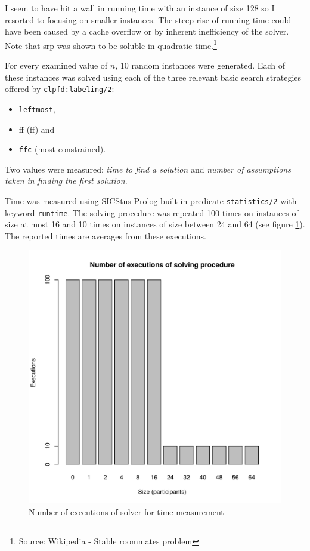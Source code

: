 \documentclass{article}
\newcommand{\code}[1]{\texttt{#1}}
\newcommand{\prolog}{Prolog}
\newcommand{\sicstusprolog}{SICStus \prolog{}}
\newcommand{\srp}{\acrshort{srp}}
\begin{document}
I seem to have hit a wall in running time with an instance of size 128
so I resorted to focusing on smaller instances.
The steep rise of running time could have been caused by a cache overflow
or by inherent inefficiency of the solver.
Note that \srp{} was shown to be soluble
in quadratic time.\footnote{Source: Wikipedia - Stable roommates problem}

For every examined value of $n$, 10 random instances were generated.
Each of these instances was solved using each of the three relevant basic
search strategies offered by \code{clpfd:labeling/2}:

\begin{itemize}
\item \code{leftmost},
\item \acrshort{ff} (\acrlong{ff}) and
\item \code{ffc} (most constrained).
\end{itemize}

Two values were measured: \emph{time to find a solution}
and \emph{number of assumptions taken in finding the first solution}.

Time was measured using \sicstusprolog{} built-in predicate \code{statistics/2}
with keyword \code{runtime}.
The solving procedure was repeated
100 times on instances of size at most 16 and
10 times on instances of size between 24 and 64
(see figure \ref{fig:executions}).
The reported times are averages from these executions.

\begin{figure}
\centering
\includegraphics[width=\linewidth]{executions}
\caption{Number of executions of solver for time measurement}
\label{fig:executions}
\end{figure}
\end{document}
